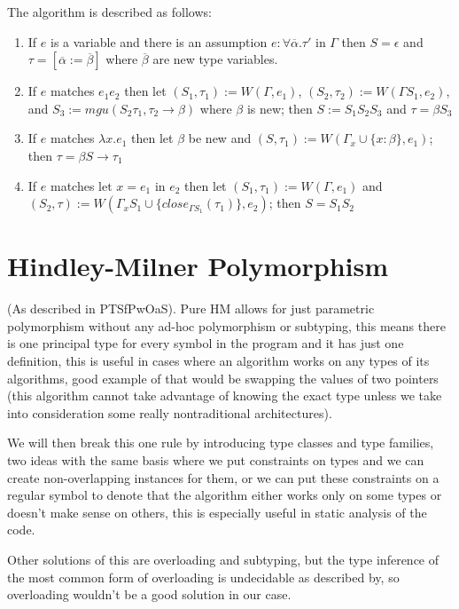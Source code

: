 The algorithm is described as follows:


\begin{enumerate}
    \item If $e$ is a variable and there is an assumption $e : \forall \overline{\alpha} . \tau'$ in $\Gamma$ then $S = \epsilon$ and $\tau = [\overline{\alpha} := \overline{\beta}]$ where $\overline{\beta}$ are new type variables.
    \item If $e$ matches $e_1 e_2$ then let $(S_1, \tau_1) := W(\Gamma, e_1)$, $(S_2, \tau_2) := W(\Gamma S_1, e_2)$, and $S_3 := mgu (S_2 \tau_1, \tau_2 \rightarrow \beta)$ where $\beta$ is new; then $S := S_1 S_2 S_3$ and $\tau = \beta S_3$
    \item If $e$ matches $\lambda x . e_1$ then let $\beta$ be new and $(S, \tau_1) := W(\Gamma_x \cup \{x : \beta\}, e_1)$; then $\tau = \beta S \rightarrow \tau_1$
    \item If $e$ matches $\text{let } x = e_1 \text{ in } e_2$ then let $(S_1, \tau_1) := W(\Gamma, e_1)$ and $(S_2, \tau) := W(\Gamma_x S_1 \cup \{close_{\Gamma S_1}(\tau_1)\}, e_2)$; then $S = S_1 S_2$
\end{enumerate}


\section{Hindley-Milner Polymorphism}

(As described in PTSfPwOaS).
Pure HM allows for just parametric polymorphism without any ad-hoc polymorphism
or subtyping, this means there is one principal type for every symbol in the program and it has just one definition, this is useful in cases
where an algorithm works on any types of its algorithms, good example of that would be swapping the values of two pointers (this algorithm cannot
take advantage of knowing the exact type unless we take into consideration some really nontraditional architectures).

We will then break this one rule by introducing type classes and type families, two ideas with the same basis where we put constraints on types and we can create non-overlapping instances for them, or we can put these constraints on a regular symbol to denote that the algorithm either works only on some types or doesn't make sense on others, this is especially useful in static analysis of the code.

Other solutions of this are overloading and subtyping, but the type inference of the most common form of overloading is undecidable
as described by, so overloading wouldn't be a good solution in our case. %

